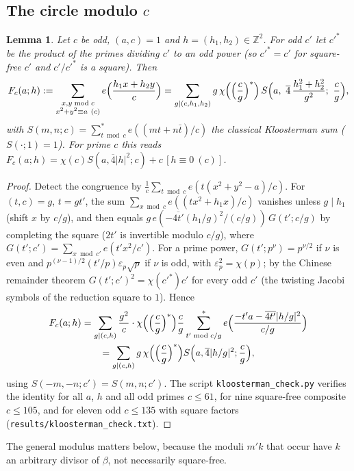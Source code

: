 \documentclass[11pt,a4paper]{article}
\newtheorem{lemma}[theorem]{Lemma}
\theoremstyle{remark}
\theoremstyle{definition}
\newcommand{\Z}{\mathbb Z}
\begin{document}
\subsection{The circle modulo $c$}
\begin{lemma}\label{lem:circle}
Let $c$ be odd, $(a,c)=1$ and $h=(h_1,h_2)\in\Z^2$. For odd $c'$ let $c'^{*}$ be the product of the primes dividing $c'$ to an odd power (so $c'^{*}=c'$ for square-free $c'$ and $c'/c'^{*}$ is a square). Then
\[
F_c(a;h):=\sum_{\substack{x,y\bmod c\\ x^2+y^2\equiv a\ (c)}}e\Bigl(\frac{h_1x+h_2y}{c}\Bigr)=\sum_{g\mid(c,h_1,h_2)}g\,\chi\Bigl(\Bigl(\frac cg\Bigr)^{*}\Bigr)\,S\Bigl(a,\ \overline4\,\frac{h_1^2+h_2^2}{g^2};\ \frac cg\Bigr),
\]
with $S(m,n;c)=\sum_{t\bmod c}^{*}e((mt+n\bar t)/c)$ the classical Kloosterman sum ($S(\cdot;1)=1$). For prime $c$ this reads $F_c(a;h)=\chi(c)S(a,\overline4|h|^2;c)+c\,[h\equiv0\ (c)]$.
\end{lemma}
\begin{proof}
Detect the congruence by $\frac1c\sum_{t\bmod c}e(t(x^2+y^2-a)/c)$. For $(t,c)=g$, $t=gt'$, the sum $\sum_{x\bmod c}e((tx^2+h_1x)/c)$ vanishes unless $g\mid h_1$ (shift $x$ by $c/g$), and then equals $g\,e(-\overline{4t'}(h_1/g)^2/(c/g))\,G(t';c/g)$ by completing the square ($2t'$ is invertible modulo $c/g$), where $G(t';c')=\sum_{x\bmod c'}e(t'x^2/c')$. For a prime power, $G(t';p^\nu)=p^{\nu/2}$ if $\nu$ is even and $p^{(\nu-1)/2}(t'/p)\varepsilon_p\sqrt p$ if $\nu$ is odd, with $\varepsilon_p^2=\chi(p)$; by the Chinese remainder theorem $G(t';c')^2=\chi(c'^{*})c'$ for every odd $c'$ (the twisting Jacobi symbols of the reduction square to $1$). Hence
\begin{multline*}
F_c(a;h)=\sum_{g\mid(c,h)}\frac{g^2}{c}\cdot\chi\Bigl(\Bigl(\frac cg\Bigr)^{*}\Bigr)\frac cg\sum_{t'\bmod c/g}^{*}e\Bigl(\frac{-t'a-\overline{4t'}|h/g|^2}{c/g}\Bigr)\\
=\sum_{g\mid(c,h)}g\,\chi\Bigl(\Bigl(\frac cg\Bigr)^{*}\Bigr)S\Bigl(a,\overline4|h/g|^2;\frac cg\Bigr),
\end{multline*}
using $S(-m,-n;c')=S(m,n;c')$. The script \texttt{kloosterman\_check.py} verifies the identity for all $a$, $h$ and all odd primes $c\le61$, for nine square-free composite $c\le105$, and for eleven odd $c\le135$ with square factors (\texttt{results/kloosterman\_check.txt}).
\end{proof}

The general modulus matters below, because the moduli $m'k$ that occur have $k$ an arbitrary divisor of $\beta$, not necessarily square-free.
\end{document}
